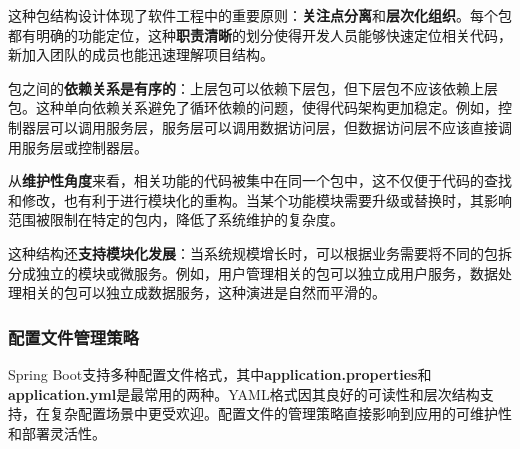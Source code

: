这种包结构设计体现了软件工程中的重要原则：\textbf{关注点分离}和\textbf{层次化组织}。每个包都有明确的功能定位，这种\textbf{职责清晰}的划分使得开发人员能够快速定位相关代码，新加入团队的成员也能迅速理解项目结构。

包之间的\textbf{依赖关系是有序的}：上层包可以依赖下层包，但下层包不应该依赖上层包。这种单向依赖关系避免了循环依赖的问题，使得代码架构更加稳定。例如，控制器层可以调用服务层，服务层可以调用数据访问层，但数据访问层不应该直接调用服务层或控制器层。

从\textbf{维护性角度}来看，相关功能的代码被集中在同一个包中，这不仅便于代码的查找和修改，也有利于进行模块化的重构。当某个功能模块需要升级或替换时，其影响范围被限制在特定的包内，降低了系统维护的复杂度。

这种结构还\textbf{支持模块化发展}：当系统规模增长时，可以根据业务需要将不同的包拆分成独立的模块或微服务。例如，用户管理相关的包可以独立成用户服务，数据处理相关的包可以独立成数据服务，这种演进是自然而平滑的。

\subsubsection{配置文件管理策略}\label{ux914dux7f6eux6587ux4ef6ux7ba1ux7406ux7b56ux7565}

Spring Boot支持多种配置文件格式，其中\textbf{application.properties}和\textbf{application.yml}是最常用的两种。YAML格式因其良好的可读性和层次结构支持，在复杂配置场景中更受欢迎。配置文件的管理策略直接影响到应用的可维护性和部署灵活性。

